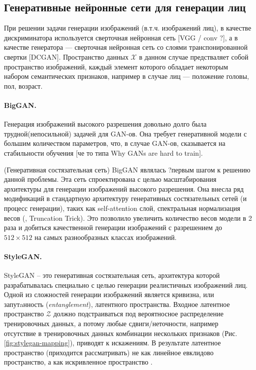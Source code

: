 \subsection{Генеративные нейронные сети для генерации лиц}

При решении задачи генерации изображений (в.т.ч. изображений лиц), в качестве дискриминатора используется сверточная нейронная сеть [VGG / conv ?], а в качестве генератора --- сверточная нейронная сеть со слоями транспонированной свертки [DCGAN].
Пространство данных $\mathcal X$ в данном случае предстваляет собой пространство изображений, каждый элемент которого обладает некоторым набором семантических признаков, например в случае лиц --- положение головы, пол, возраст.

\paragraph{BigGAN.}
Генерация изображений высокого разрешения довольно долго была трудной(непосильной) задачей для GAN-ов. Она требует генеративной модели с большим количеством параметров, что, в случае GAN-ов, сказывается на стабильности обучения [че то типа Why GANs are hard to train].

(Генеративная состязательная сеть) BigGAN \cite{bigGAN} являлась ?первым шагом к решению данной проблемы. Эта сеть спроектирована с целью масштабирования архитектуры для генерации изображений высокого разрешения.
Она внесла ряд модификаций в стандартную архитектуру генеративных состязательных сетей (и процесс генерации), таких как self-attention слой, спектральная нормализация весов (, Truncation Trick). Это позволило увеличить количество весов модели в 2 раза и добиться качественной генерации изображений с разрешением до $512\times512$ на самых разнообразных классах изображений.


\paragraph{StyleGAN.}
StyleGAN \cite{StyleGAN} – это генеративная состязательная сеть, архитектура которой разрабатывалась специально с целью генерации реалистичных изображений лиц.
Одной из сложностей генерации изображений является кривизна, или запутaнность (\emph{entanglement}), латентного пространства. 
Входное латентное пространство $\mathcal Z$ должно подстраиваться под вероятносное распределение тренировочных данных, а потому любые сдвиги/неточности, например отсутствие в тренировочных данных комбинации нескольких признаков (Рис. \ref{fig:stylegan-mapping}), приводят к искажениям.
В результате латентное пространство (приходится рассматривать) не как линейное евклидово пространство, а как искривленное пространство \cite{arvanitidis2018oddity}.

